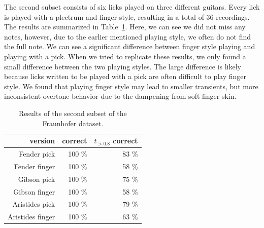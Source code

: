 \documentclass[a4paper,10pt,twocolumn]{article}
\begin{document}
The second subset consists of six licks played on three different guitars. Every lick is played with a plectrum and finger style, resulting in a total of 36 recordings. 
The results are summarized in Table~\ref{tab:expacc2}. Here, we can see we did not miss any notes, however, due to the earlier mentioned playing style, we often do not find the full note. We can see a significant difference between finger style playing and playing with a pick. When we tried to replicate these results, we only found a small difference between the two playing styles. The large difference is likely because licks written to be played with a pick are often difficult to play finger style. We found that playing finger style may lead to smaller transients, but more inconsistent overtone behavior due to the dampening from soft finger skin.
\begin{table}[h]
    \centering
    \begin{tabular}{r|rr}
        version          & correct & $t_{>0.8}$ correct \\
        \hline
        Fender pick      & 100 \%  & 83 \% \\
        Fender finger    & 100 \%  & 58 \% \\
        Gibson pick      & 100 \%  & 75 \% \\
        Gibson finger    & 100 \%  & 58 \% \\
        Aristides pick   & 100 \%  & 79 \% \\
        Aristides finger & 100 \%  & 63 \%
    \end{tabular}
    \caption{Results of the second subset of the Fraunhofer dataset.}
    \label{tab:expacc2}
\end{table}
\end{document}
